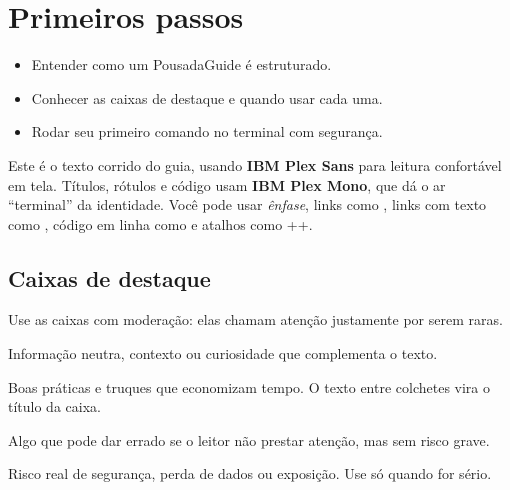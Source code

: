 \documentclass{pousadaguide}
\begin{document}
\capa
\tableofcontents

\chapter{Primeiros passos}

\begin{missao}
\begin{itemize}
  \item Entender como um PousadaGuide é estruturado.
  \item Conhecer as caixas de destaque e quando usar cada uma.
  \item Rodar seu primeiro comando no terminal com segurança.
\end{itemize}
\end{missao}

Este é o texto corrido do guia, usando \textbf{IBM Plex Sans} para leitura
confortável em tela. Títulos, rótulos e código usam \textbf{IBM Plex Mono}, que
dá o ar ``terminal'' da identidade. Você pode usar \emph{ênfase}, links como
, links com texto como ,
código em linha como  e atalhos como
++.

\section{Caixas de destaque}

Use as caixas com moderação: elas chamam atenção justamente por serem raras.

\begin{nota}
Informação neutra, contexto ou curiosidade que complementa o texto.
\end{nota}

\begin{dica}
Boas práticas e truques que economizam tempo. O texto entre colchetes vira o
título da caixa.
\end{dica}

\begin{atencao}
Algo que pode dar errado se o leitor não prestar atenção, mas sem risco grave.
\end{atencao}

\begin{perigo}
Risco real de segurança, perda de dados ou exposição. Use só quando for sério.
\end{perigo}
\end{document}
